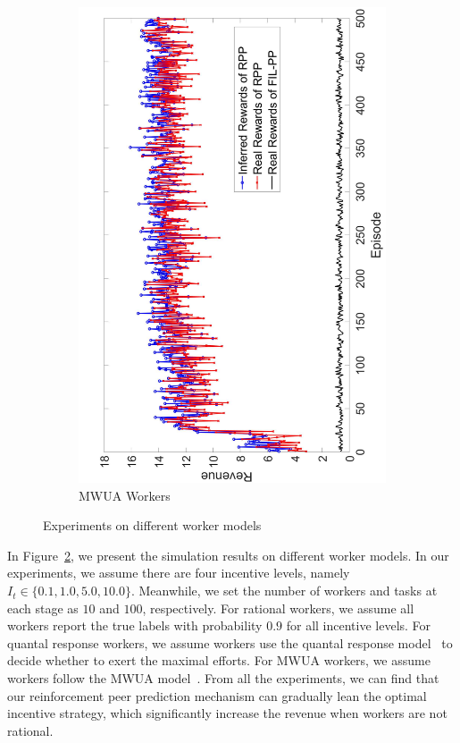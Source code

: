 \documentclass{article}
\begin{document}
\begin{figure}[htb]
\begin{subfigure}[t]{0.32\textwidth}
        \includegraphics[width=\textwidth]{image/3}
        \caption{\label{E3}  MWUA Workers}
    \end{subfigure}    
    \caption{\label{ED}Experiments on different worker models}
    \vspace{-1mm}
\end{figure}
In Figure~\ref{ED}, we present the simulation results on different worker models.
In our experiments, we assume there are four incentive levels, namely $I_t\in \{0.1, 1.0, 5.0, 10.0\}$.
Meanwhile, we set the number of workers and tasks at each stage as $10$ and $100$, respectively.
For rational workers, we assume all workers report the true labels with probability $0.9$ for all incentive levels.
For quantal response workers, we assume workers use the quantal response model~\cite{mckelvey1995quantal} to decide whether to exert the maximal efforts.
For MWUA workers, we assume workers follow the MWUA model~\cite{chastain2014algorithms}.
From all the experiments, we can find that our reinforcement peer prediction mechanism can gradually lean the optimal incentive strategy, which significantly increase the revenue when workers are not rational.
\end{document}
